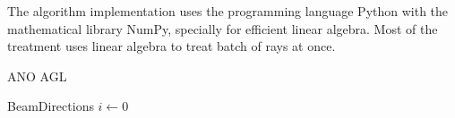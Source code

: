 The algorithm implementation uses the programming language Python with the
mathematical library NumPy, specially for efficient linear algebra. Most of the
treatment uses linear algebra to treat batch of rays at once.
\begin{algorithm}
\caption{ANO AGL}
\begin{algorithmic}
\Require BeamDirections
    \State $i\gets 0$
\EndIf
\EndFor
\end{algorithmic}
\end{algorithm}